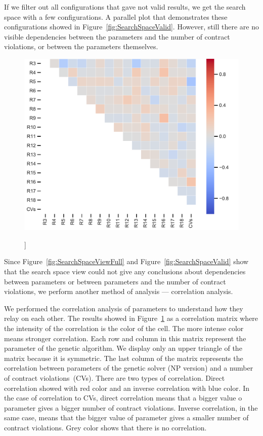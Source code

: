 If we filter out all configurations that gave not valid results, we get the search space with a few configurations. A parallel plot that demonstrates these configurations showed in Figure~\ref{fig:SearchSpaceValid}. However, still there are no visible dependencies between the parameters and the number of contract violations, or between the parameters themselves.

\begin{figure}
	\centering
	\includegraphics[width=\textwidth]{images/CorrelationAnalysis.pdf}
	\caption[]]{}
	\label{fig:CorrelationAnalysis}
\end{figure}

Since Figure~\ref{fig:SearchSpaceViewFull} and Figure~\ref{fig:SearchSpaceValid} show that the search space view could not give any conclusions about dependencies between parameters or between parameters and the number of contract violations, we perform another method of analysis — correlation analysis.

We performed the correlation analysis of parameters to understand how they relay on each other. The results showed in Figure~\ref{fig:CorrelationAnalysis} as a correlation matrix where the intensity of the correlation is the color of the cell. The more intense color means stronger correlation. Each row and column in this matrix represent the parameter of the genetic algorithm. We display only an upper triangle of the matrix because it is symmetric. The last column of the matrix represents the correlation between parameters of the genetic solver (NP version) and a number of contract violations~(CVs). There are two types of correlation. Direct correlation showed with red color and an inverse correlation with blue color. In the case of correlation to CVs, direct correlation means that a bigger value o parameter gives a bigger number of contract violations. Inverse correlation, in the same case, means that the bigger value of parameter gives a smaller number of contract violations. Grey color shows that there is no correlation.

